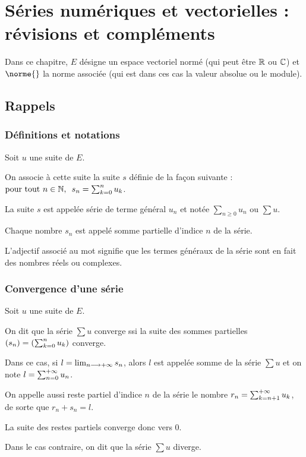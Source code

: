 \chapter{Séries numériques et vectorielles : révisions et compléments}

\minitoc

Dans ce chapitre, \(E\) désigne un espace vectoriel normé (qui peut être \(\mathbb{R}\) ou \(\mathbb{C}\)) et \(\norme{}\) la norme associée (qui est dans ces cas la valeur absolue ou le module).

\section{Rappels}

\subsection{Définitions et notations}

\begin{defi}
Soit \(u\) une suite de \(E\).

On associe à cette suite la suite \(s\) définie de la façon suivante : \(\quantifs{\tpt n\in\N}s_n=\sum_{k=0}^nu_k\).

La suite \(s\) est appelée série de terme général \(u_n\) et notée \(\sum_{n\geq0}u_n\) ou \(\sum u\).

Chaque nombre \(s_n\) est appelé somme partielle d'indice \(n\) de la série.
\end{defi}

L'adjectif  associé au mot  signifie que les termes généraux de la série sont en fait des nombres réels ou complexes.

\subsection{Convergence d'une série}

\begin{defi}
Soit \(u\) une suite de \(E\).

On dit que la série \(\sum u\) converge ssi la suite des sommes partielles \(\left(s_n\right)=\left(\sum_{k=0}^nu_k\right)\) converge.

Dans ce cas, si \(l=\lim_{n\longrightarrow+\infty}s_n\), alors \(l\) est appelée somme de la série \(\sum u\) et on note \(l=\sum_{n=0}^{+\infty}u_n\).

On appelle aussi reste partiel d'indice \(n\) de la série le nombre \(r_n=\sum_{k=n+1}^{+\infty}u_k\), de sorte que \(r_n+s_n=l\).

La suite des restes partiels converge donc vers \(0\).

Dans le cas contraire, on dit que la série \(\sum u\) diverge.
\end{defi}

